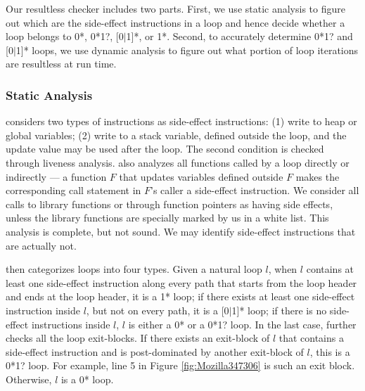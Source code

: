 Our resultless checker includes two parts. First, we use static analysis
to figure out which are the side-effect instructions in a loop and hence
decide whether a loop belongs to 0*, 0*1?, [0$|$1]*, or 1*. Second, to
accurately determine 0*1? and [0$|$1]* loops, we use
dynamic analysis to figure out what portion of loop iterations are
resultless at run time.


\subsubsection{Static Analysis}
\label{sec:s_workless}

\Tool considers two types of instructions as side-effect instructions:
(1) write to heap or global variables;
(2) write to a stack variable, defined outside the loop, and the update value
may be used after the loop. The second condition is checked through liveness
analysis.
\Tool also analyzes all functions called
by a loop directly or indirectly --- a function $F$ that updates variables
defined outside $F$ makes the corresponding call statement in $F$'s
caller a side-effect instruction.
We consider all calls to library functions or through function pointers 
as having side effects, 
unless the library functions are specially marked by us in a white list.
This analysis is complete, but not sound. We may identify side-effect
instructions that are actually not.  

\Tool then categorizes loops into four types.
Given a natural loop $l$, when $l$
contains at least one side-effect instruction along every path that
starts from the loop header and ends at the loop header, it is a 1* loop;
if there exists at least one side-effect instruction inside $l$, but not on
every path,
it is a [0$|$1]* loop; if there is no side-effect instructions inside $l$,
$l$ is either a 0* or a 0*1? loop.
In the last case, \Tool further checks all the loop exit-blocks. If there 
exists an exit-block of $l$ that contains a side-effect instruction and is  
post-dominated by another exit-block of $l$, this is a 0*1? loop.
For example, line 5 in Figure \ref{fig:Mozilla347306} is such an exit block.
Otherwise, $l$ is a 0* loop.

